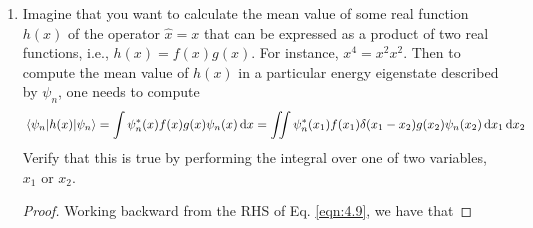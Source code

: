 \documentclass[../psets.tex]{subfiles}
\begin{document}
\begin{enumerate}
\begin{enumerate}
\begin{proof}
            Let $\psi:\R\to\C$ be an arbitrary, smooth function in the variable $x_2$. To prove the equality in Eq. \ref{eqn:4.8}, it will suffice to show that
            \begin{equation*}
                \int\delta(x_1-x_2)\psi(x_2)\dd{x_2} = \int\sum_m\psi_m(x_1)\psi_m^*(x_2)\psi(x_2)\dd{x_2}
            \end{equation*}
            Note that this integral and all following integrals are over all space, that is, $(-\infty,\infty)$. By the properties of the Dirac delta function, the left side of the above equality evaluates to
            \begin{equation*}
                \int\delta(x_1-x_2)\psi(x_2)\dd{x_2} = \psi(x_1)
            \end{equation*}
            The right side is a bit more complicated since it involves the expansion of $\psi$ that we are allowed to do by Eq. \ref{eqn:4.7}. However, it evaluates directly all the same, as follows.
            \begin{align*}
                \int\sum_m\psi_m(x_1)\psi_m^*(x_2)\psi(x_2)\dd{x_2} &= \int\sum_m\psi_m(x_1)\psi_m^*(x_2)\left( \sum_{n=0}^\infty c_n\psi_n(x_2) \right)\dd{x_2}\\
                &= \sum_m\sum_{n=0}^\infty c_n\psi_m(x_1)\int\psi_m^*(x_2)\psi_n(x_2)\dd{x_2}\\
                &= \sum_{n=0}^\infty c_n\psi_n(x_1)\\
                &= \psi(x_1)
            \end{align*}
            Therefore, by transitivity, we have the desired equality.
        \end{proof}
        \item Imagine that you want to calculate the mean value of some real function $h(x)$ of the operator $\hat{x}=x$ that can be expressed as a product of two real functions, i.e., $h(x)=f(x)g(x)$. For instance, $x^4=x^2x^2$. Then to compute the mean value of $h(x)$ in a particular energy eigenstate described by $\psi_n$, one needs to compute
        \begin{equation}\label{eqn:4.9}
            \ev{h(x)}{\psi_n} = \int\psi_n^*(x)f(x)g(x)\psi_n(x)\dd{x}
            = \iint\psi_n^*(x_1)f(x_1)\delta(x_1-x_2)g(x_2)\psi_n(x_2)\dd{x_1}\dd{x_2}
        \end{equation}
        Verify that this is true by performing the integral over one of two variables, $x_1$ or $x_2$.
        \begin{proof}
            Working backward from the RHS of Eq. \ref{eqn:4.9}, we have that

\end{proof}
\end{enumerate}
\end{enumerate}
\end{document}
